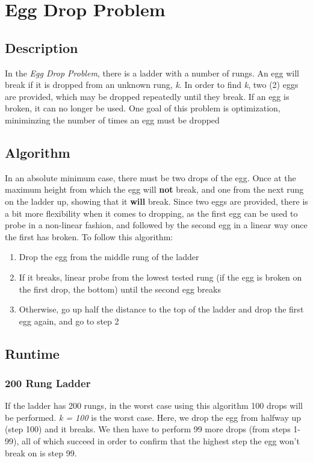 \documentclass[titlepage]{article}
\numberwithin{equation}{subsection}
\begin{document}
\section{Egg Drop Problem}
\subsection{Description}
In the \textit{Egg Drop Problem}, there is a ladder with a number of rungs. An egg will
break if it is dropped from an unknown rung, \textit{k}. In order to find \textit{k}, two (2) 
eggs are provided, which may be dropped repeatedly until they break. If an egg is broken,
it can no longer be used. One goal of this problem is optimization, miniminzing the number
of times an egg must be dropped
\subsection{Algorithm}
In an absolute minimum case, there must be two drops of the egg. Once at the maximum height
from which the egg will \textbf{not} break, and one from the next rung on the ladder up, showing
that it \textbf{will} break. Since two eggs are provided, there is a bit
more flexibility when it comes to dropping, as the first egg can be used
to probe in a non-linear fashion, and followed by the second egg in a linear
way once the first has broken. To follow this algorithm:
\begin{enumerate}
    \item Drop the egg from the middle rung of the ladder
    \item If it breaks, linear probe from the lowest tested rung (if the egg is broken on the first drop, the bottom) until the second egg breaks
    \item Otherwise, go up half the distance to the top of the ladder and drop the first egg again, and go to step 2
\end{enumerate}
\subsection{Runtime}
\subsubsection{200 Rung Ladder}
If the ladder has 200 rungs, in the worst case using this algorithm 100 drops will be performed.
\textit{k = 100} is the worst case. Here, we drop the egg from halfway up (step 100) and it breaks.
We then have to perform 99 more drops (from steps 1-99), all of which succeed in order to confirm that
the highest step the egg won't break on is step 99. 
\end{document}
